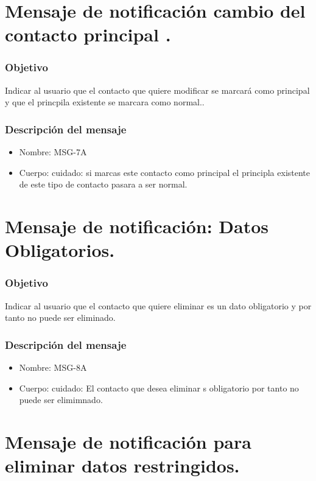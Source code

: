 \section{Mensaje de notificación cambio del contacto principal .}\label{MSG7A}

\subsubsection{Objetivo}
Indicar al usuario que el contacto que quiere modificar se marcará como principal y que el princpila existente se marcara como normal..

\subsubsection{Descripción del mensaje}
\begin{itemize}
\item Nombre: MSG-7A
\item Cuerpo: cuidado: si marcas este contacto como principal el principla existente de este tipo de contacto pasara a ser normal.

\end{itemize}

\section{Mensaje de notificación: Datos Obligatorios.}\label{MSG8A}

\subsubsection{Objetivo}
Indicar al usuario que el contacto que quiere eliminar es un dato obligatorio y por tanto no puede ser eliminado.

\subsubsection{Descripción del mensaje}
\begin{itemize}
\item Nombre: MSG-8A
\item Cuerpo: cuidado: El contacto que desea eliminar s obligatorio por tanto no puede ser elimimnado.

\end{itemize}
\section{Mensaje de notificación para eliminar datos restringidos.}\label{MSG6B}

